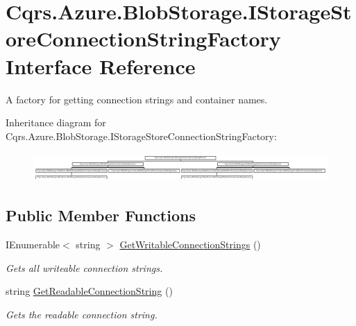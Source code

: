 \hypertarget{interfaceCqrs_1_1Azure_1_1BlobStorage_1_1IStorageStoreConnectionStringFactory}{}\section{Cqrs.\+Azure.\+Blob\+Storage.\+I\+Storage\+Store\+Connection\+String\+Factory Interface Reference}
\label{interfaceCqrs_1_1Azure_1_1BlobStorage_1_1IStorageStoreConnectionStringFactory}


A factory for getting connection strings and container names.  


Inheritance diagram for Cqrs.\+Azure.\+Blob\+Storage.\+I\+Storage\+Store\+Connection\+String\+Factory\+:\begin{figure}[H]
\begin{center}
\leavevmode
\includegraphics[height=1.115538cm]{interfaceCqrs_1_1Azure_1_1BlobStorage_1_1IStorageStoreConnectionStringFactory}
\end{center}
\end{figure}
\subsection*{Public Member Functions}
\begin{DoxyCompactItemize}
\item 
I\+Enumerable$<$ string $>$ \hyperlink{interfaceCqrs_1_1Azure_1_1BlobStorage_1_1IStorageStoreConnectionStringFactory_a26ecfd0805fe3d525e9fa419330bd140_a26ecfd0805fe3d525e9fa419330bd140}{Get\+Writable\+Connection\+Strings} ()
\begin{DoxyCompactList}\small\item\em Gets all writeable connection strings. \end{DoxyCompactList}\item 
string \hyperlink{interfaceCqrs_1_1Azure_1_1BlobStorage_1_1IStorageStoreConnectionStringFactory_a0ed836289e048767f753630bbcc98d5d_a0ed836289e048767f753630bbcc98d5d}{Get\+Readable\+Connection\+String} ()
\begin{DoxyCompactList}\small\item\em Gets the readable connection string. \end{DoxyCompactList}\end{DoxyCompactItemize}



